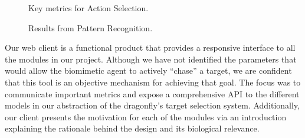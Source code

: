 \documentclass[a4paper,11pt]{article}
\begin{document}
\begin{figure}[H]
\begin{minipage}{0.5\textwidth}
\centering
{}
\caption{Key metrics for Action Selection.}
\end{minipage}
\begin{minipage}{0.5\textwidth}
\centering
{}
\caption{Results from Pattern Recognition.}
\end{minipage}
\end{figure}

Our web client is a functional product that provides a responsive interface to all the modules
in our project. Although we have not identified the parameters that would allow the biomimetic
agent to actively ``chase'' a target, we are confident that this tool is an objective mechanism
for achieving that goal. The focus was to communicate important metrics and expose a comprehensive
API to the different models in our abstraction of the dragonfly's target selection system. Additionally, our
client presents the motivation for each of the modules via an introduction explaining the rationale
behind the design and its biological relevance.
\end{document}
